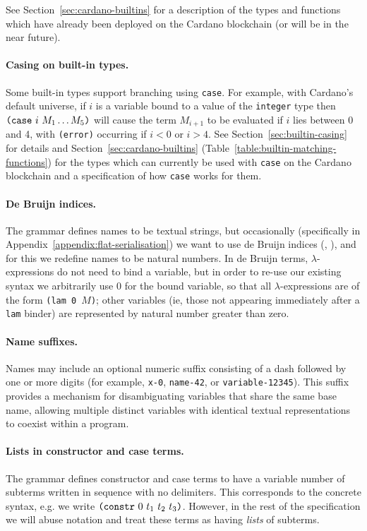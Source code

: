 See Section~\ref{sec:cardano-builtins} for a description of the types and
functions which have already been deployed on the Cardano blockchain (or will be
in the near future).

\paragraph{Casing on built-in types.}  Some built-in types
support branching using \texttt{case}.  For example, with Cardano's default
universe, if $i$ is a variable bound to a value of the \texttt{integer} type
then $\texttt{(} \texttt{case} ~ i ~ M_1 \ldots M_5 \texttt{)}$ will cause the term $M_{i+1}$ to be evaluated if
$i$ lies between 0 and 4, with \texttt{(error)} occurring if $i<0$ or $i>4$.
See Section~\ref{sec:builtin-casing} for details and
Section~\ref{sec:cardano-builtins}
(Table~\ref{table:builtin-matching-functions}) for the types which can currently
be used with \texttt{case} on the Cardano blockchain and a specification of how
\texttt{case} works for them.


\paragraph{De Bruijn indices.}
The grammar defines names to be textual strings, but occasionally (specifically
in Appendix~\ref{appendix:flat-serialisation}) we want to use de Bruijn indices
(\cite{deBruijn}, \cite[C.3]{Barendregt}), and for this we redefine names to be
natural numbers.  In de Bruijn terms, $\lambda$-expressions do not need to bind
a variable, but in order to re-use our existing syntax we arbitrarily use 0 for
the bound variable, so that all $\lambda$-expressions are of the form
\texttt{(lam 0 $M$)}; other variables (ie, those not appearing immediately after
a \texttt{lam} binder) are represented by natural number greater than zero.

\paragraph{Name suffixes.}
Names may include an optional numeric suffix consisting of a dash followed by
one or more digits (for example, \texttt{x-0}, \texttt{name-42}, or
\texttt{variable-12345}). This suffix provides a mechanism for disambiguating
variables that share the same base name, allowing multiple distinct variables
with identical textual representations to coexist within a program.

\paragraph{Lists in constructor and case terms.}
The grammar defines constructor and case terms to have a variable number of
subterms written in sequence with no delimiters. This corresponds to the
concrete syntax, e.g. we write $\texttt{(} \texttt{constr} ~ 0 ~ t_1\ t_2\ t_3 \texttt{)}$. However, in the
rest of the specification we will abuse notation and treat these terms as
having \emph{lists} of subterms.
